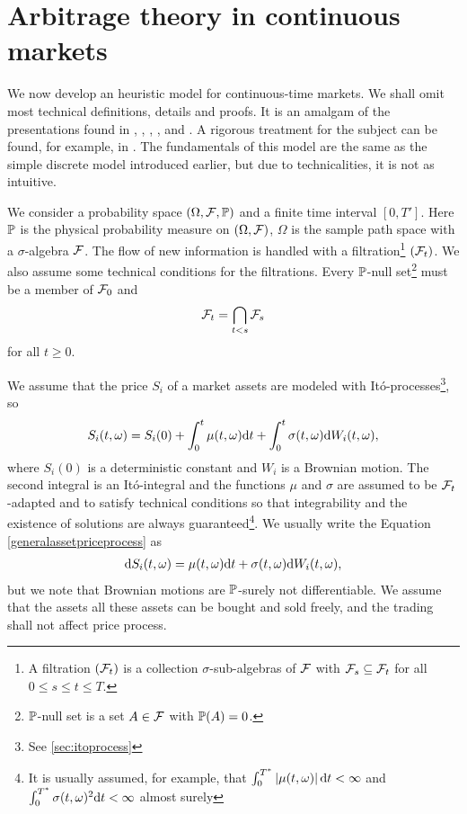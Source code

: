 \section{Arbitrage theory in continuous markets}

We now develop an heuristic model for continuous-time markets. We shall omit most technical definitions, details and proofs. It is an amalgam of the presentations found in \textcite{bjork2004arbitrage}, \textcite{brigo2007interest}, \textcite{duffie2010dynamic}, \textcite{jameswebber2000interest}, \textcite{musielarutkowski2005martingale} and \textcite{wu2009interest}. A rigorous treatment for the subject can be found, for example, in \textcite{musielarutkowski2005martingale}. The fundamentals of this model are the same as the simple discrete model introduced earlier, but due to technicalities, it is not as intuitive.

We consider a probability space $(\Omega, \mathcal{F}, \mathbb{P})$ and a finite time interval $\left[ 0, T' \right]$. Here $\mathbb{P}$ is the physical probability measure on $(\Omega, \mathcal{F})$, $\Omega$ is the sample path space with a $\sigma$-algebra $\mathcal{F}$. The flow of new information is handled with a filtration\footnote{A filtration $(\mathcal{F}_t)$ is a collection $\sigma$-sub-algebras of $\mathcal{F}$ with $\mathcal{F}_s \subseteq \mathcal{F}_t$ for all $0 \leq s \leq t \leq T$.} $(\mathcal{F}_t)$. We also assume some technical conditions for the filtrations. Every $\mathbb{P}$-null set\footnote{$\mathbb{P}$-null set is a set $A \in \mathcal{F}$ with $\mathbb{P} (A) = 0$.} must be a member of $\mathcal{F}_0$ and
  \begin{align}
    \mathcal{F}_t = \bigcap_{t < s} \mathcal{F}_s
  \end{align}
for all $t \geq 0$.

We assume that the price $S_i$ of a market assets are modeled with It\'{o}-processes\footnote{See \ref{sec:itoprocess}}, so
  \begin{align}
    \label{generalassetpriceprocess}
    S_i(t,\omega) = S_i (0) + \int_0^t \mu (t,\omega) \mathrm{d} t + \int_0^t \sigma(t, \omega ) \mathrm{d} W_i (t, \omega),
  \end{align}
where $S_i(0)$ is a deterministic constant and $W_i$ is a Brownian motion. The second integral is an It\'{o}-integral and the functions $\mu$ and $\sigma$ are assumed to be $\mathcal{F}_t$-adapted and to satisfy technical conditions so that integrability and the existence of solutions are always guaranteed\footnote{It is usually assumed, for example, that $\int_0^{T^*} \left| \mu(t, \omega) \right| \mathrm{d} t < \infty$ and $\int_0^{T^*} \sigma(t, \omega)^2 \mathrm{d} t < \infty$ almost surely}. We usually write the Equation \ref{generalassetpriceprocess} as
  \begin{align}
    \mathrm{d} S_i(t, \omega) = \mu (t,\omega) \mathrm{d} t + \sigma(t, \omega ) \mathrm{d} W_i (t, \omega),
  \end{align}
but we note that Brownian motions are $\mathbb{P}$-surely not differentiable. We assume that the assets all these assets can be bought and sold freely, and the trading shall not affect price process.

